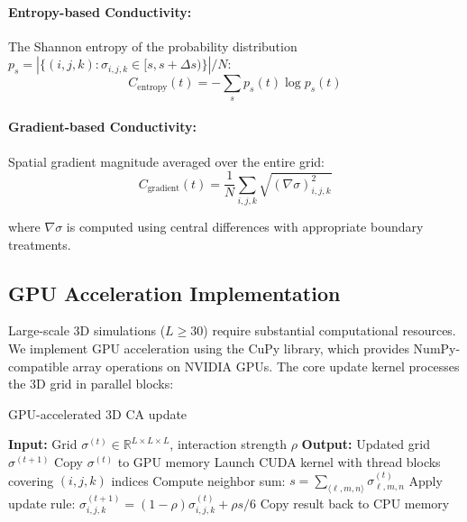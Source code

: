 \paragraph{Entropy-based Conductivity:}
The Shannon entropy of the probability distribution $p_s = |\{(i,j,k): \sigma_{i,j,k} \in [s, s+\Delta s)\}|/N$:
\begin{equation}
C_{\text{entropy}}(t) = -\sum_{s} p_s(t) \log p_s(t)
\label{eq:entropy}
\end{equation}

\paragraph{Gradient-based Conductivity:}
Spatial gradient magnitude averaged over the entire grid:
\begin{equation}
C_{\text{gradient}}(t) = \frac{1}{N}\sum_{i,j,k} \sqrt{(\nabla \sigma)_{i,j,k}^2}
\label{eq:gradient}
\end{equation}

where $\nabla \sigma$ is computed using central differences with appropriate 
boundary treatments.

\subsection{GPU Acceleration Implementation}

Large-scale 3D simulations ($L \geq 30$) require substantial computational 
resources. We implement GPU acceleration using the CuPy library, which provides 
NumPy-compatible array operations on NVIDIA GPUs. The core update kernel 
processes the 3D grid in parallel blocks:

\begin{algorithm}[t]
\caption{GPU-accelerated 3D CA update}
\label{alg:gpu_update}
\begin{algorithmic}[1]
\STATE \textbf{Input:} Grid $\sigma^{(t)} \in \mathbb{R}^{L \times L \times L}$, interaction strength $\rho$
\STATE \textbf{Output:} Updated grid $\sigma^{(t+1)}$
\STATE Copy $\sigma^{(t)}$ to GPU memory
\STATE Launch CUDA kernel with thread blocks covering $(i,j,k)$ indices
    \STATE Compute neighbor sum: $s = \sum_{\langle \ell,m,n \rangle} \sigma_{\ell,m,n}^{(t)}$
    \STATE Apply update rule: $\sigma_{i,j,k}^{(t+1)} = (1-\rho)\sigma_{i,j,k}^{(t)} + \rho s/6$
\ENDFOR
\STATE Copy result back to CPU memory
\end{algorithmic}
\end{algorithm}

